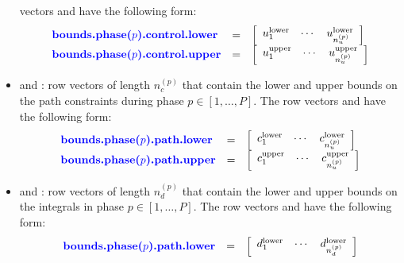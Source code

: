\documentclass[10pt]{article}
\newcommand{\bfblue}[1]{\textrm{{\color{blue}{\bf #1}}}}
\begin{document}
\begin{itemize}
vectors \bfblue{bounds.phase($p$).control.lower} and
\bfblue{bounds.phase($p$).control.upper} have the following form:
\begin{displaymath}
 \begin{array}{lcl}
   \bfblue{bounds.phase($p$).control.lower} & = &
  \left[\begin{array}{ccc} u_{1}^{\textrm{lower}} & \cdots & u_{n_u^{(p)}}^{\textrm{lower}}\end{array}\right] \\
   \bfblue{bounds.phase($p$).control.upper} & = &
  \left[\begin{array}{ccc} u_{1}^{\textrm{upper}} & \cdots & u_{n_u^{(p)}}^{\textrm{upper}}\end{array}\right]
\end{array}
\end{displaymath}
\item \bfblue{bounds.phase($p$).path.lower} and \bfblue{bounds.phase($p$).path.upper}:
row vectors of length $n_c^{(p)}$ that contain the lower and upper
bounds on the path constraints during phase $p\in[1,\ldots,P]$.  The row
vectors \bfblue{bounds.phase($p$).path.lower} and
\bfblue{bounds.phase($p$).path.upper} have the following form:
\begin{displaymath}
 \begin{array}{lcl}
   \bfblue{bounds.phase($p$).path.lower} & = &
  \left[\begin{array}{ccc} c_{1}^{\textrm{lower}} & \cdots & c_{n_u^{(p)}}^{\textrm{lower}}\end{array}\right] \\
   \bfblue{bounds.phase($p$).path.upper} & = &
  \left[\begin{array}{ccc} c_{1}^{\textrm{upper}} & \cdots & c_{n_u^{(p)}}^{\textrm{upper}}\end{array}\right]
\end{array}
\end{displaymath}
\item \bfblue{bounds.phase($p$).integral.lower} and \bfblue{bounds.phase($p$).integral.upper}:
row vectors of length $n_d^{(p)}$ that contain the lower and upper
bounds on the integrals in phase $p\in[1,\ldots,P]$.  The row
vectors \bfblue{bounds.phase($p$).integral.lower} and
\bfblue{bounds.phase($p$).integral.upper} have the following form:
\begin{displaymath}
 \begin{array}{lcl}
   \bfblue{bounds.phase($p$).path.lower} & = &
  \left[\begin{array}{ccc} d_{1}^{\textrm{lower}} & \cdots & d_{n_d^{(p)}}^{\textrm{lower}}\end{array}\right] \\

\end{array}
\end{displaymath}
\end{itemize}
\end{document}
